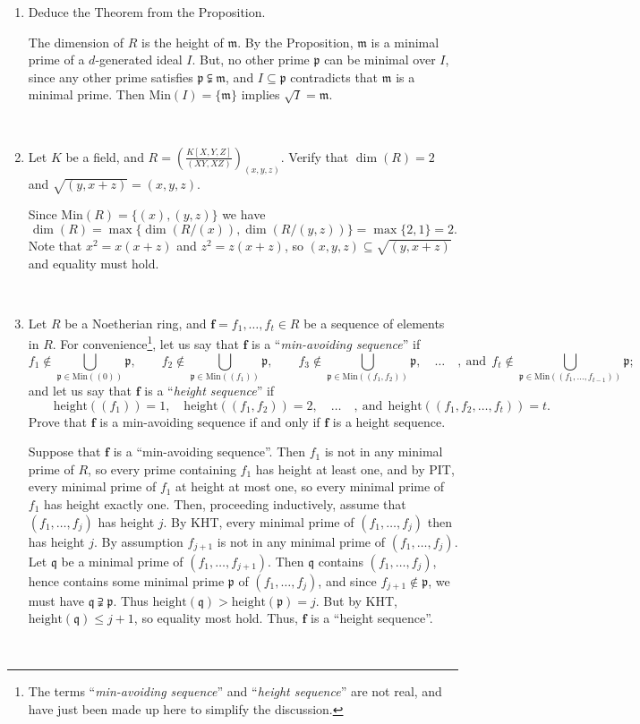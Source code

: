 \documentclass[12pt]{amsart}
\newcommand{\Bold}[1]{\contour{black}{#1}}
\newcommand{\m}{\mathfrak{m}}
\newcommand{\p}{\mathfrak{p}}
\newcommand{\q}{\mathfrak{q}}
\newcommand{\hgt}{\mathrm{height}}
\newcommand{\Min}{\mathrm{Min}}
\renewcommand{\1}{\mathbbm{1}}
\newcommand{\ds}{\displaystyle}
\newcommand{\solution}[1]{\ifthenelse {\equal{\displaysol}{1}} {\begin{framed}{\color{meretale}\noindent #1}\end{framed}} { \ }}
\newcommand\itemA{\stepcounter{enumi}\item[{\Bold{(\theenumi)}}]}
\begin{document}
\begin{enumerate}
\itemA Deduce the Theorem from the Proposition.

\solution{The dimension of $R$ is the height of $\m$. By the Proposition, $\m$ is a minimal prime of a $d$-generated ideal $I$. But, no other prime $\p$ can be minimal over $I$, since any other prime satisfies $\p\subsetneqq \m$, and $I \subseteq \p$ contradicts that $\m$ is a minimal prime. Then $\Min(I) = \{ \m \}$ implies $\sqrt{I}=\m$.}

\itemA Let $K$ be a field, and $\ds R=\left(\frac{K[X,Y,Z]}{(XY,XZ)}\right)_{\!\!(x,y,z)}$. Verify that $\dim(R)=2$ and ${\sqrt{(y,x+z)}=(x,y,z)}$.

\solution{Since $\Min(R)=\{(x),(y,z)\}$ we have \[\dim(R)=\max\{\dim(R/(x)),\dim(R/(y,z))\} = \max\{ 2,1\} = 2.\] Note that $x^2 = x(x+z)$ and $z^2=z(x+z)$, so $(x,y,z)\subseteq\sqrt{(y,x+z)}$ and equality must hold.}

\itemA Let $R$ be a Noetherian ring, and $\mathbf{f}=f_1,\dots,f_t\in R$ be a sequence of elements in $R$.
For convenience\footnote{The terms ``\textit{min-avoiding sequence}'' and ``\textit{height sequence}'' are not real, and have just been made up here to simplify the discussion.}, let us say that $\mathbf{f}$ is a ``\textit{min-avoiding sequence}'' if
\[ f_1\notin \!\!\!\!\!\bigcup_{\p\in \Min((0))}\!\!\!\!\! \p, \qquad f_2\notin \!\!\!\!\!\!\!\bigcup_{\p\in \Min((f_1))} \!\!\!\!\!\! \p, \qquad f_3\notin \!\!\!\!\!\!\!\!\!\bigcup_{\p\in \Min((f_1,f_2))} \!\!\!\!\!\!\!\!\! \p, \quad \dots \quad , \ \text{and} \ \ f_t\notin\!\!\!\!\!\!\!\!\!\!\!\!\! \bigcup_{\p\in \Min((f_1,\dots,f_{t-1}))} \!\!\!\!\!\!\!\!\!\!\!\!\! \p ;\]
and let us say that $\mathbf{f}$ is a ``\textit{height sequence}'' if
\[ \qquad \hgt((f_1))=1, \quad \hgt((f_1,f_2))=2, \quad \dots \quad , \ \text{and} \ \ \hgt((f_1,f_2,\dots,f_t))=t.\]
Prove that $\mathbf{f}$ is a min-avoiding sequence if and only if $\mathbf{f}$ is a height sequence.

\solution{
Suppose that $\mathbf{f}$ is a ``min-avoiding sequence''. Then $f_1$ is not in any minimal prime of $R$, so every prime containing $f_1$ has height at least one, and by PIT, every minimal prime of $f_1$ at height at most one, so every minimal prime of $f_1$ has height exactly one. Then, proceeding inductively, assume that $(f_1,\dots,f_j)$ has height $j$. By KHT, every minimal prime of $(f_1,\dots,f_j)$ then has height $j$. By assumption $f_{j+1}$ is not in any minimal prime of  $(f_1,\dots,f_j)$. Let $\q$ be a minimal prime of $(f_1,\dots,f_{j+1})$. Then $\q$ contains $(f_1,\dots,f_j)$, hence contains some minimal prime $\p$ of $(f_1,\dots,f_j)$, and since $f_{j+1} \notin \p$, we must have $\q \supsetneqq \p$. Thus $\hgt(\q) > \hgt(\p)=j$. But by KHT, $\hgt(\q)\leq j+1$, so equality most hold. Thus,  $\mathbf{f}$ is a ``height sequence''.

}
\end{enumerate}
\end{document}
